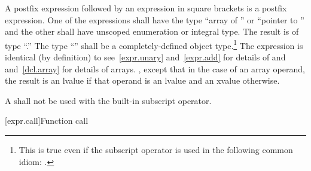 \pnum
{}%
%
A postfix expression followed by an expression in square brackets is a
postfix expression. One of the expressions shall have the type ``array of
'' or ``pointer
to '' and the other shall have unscoped enumeration or integral type.
The result is of type ``.''
%
The type ``'' shall be a completely-defined object type.\footnote{This
is true even if the subscript operator is used in the following common idiom:
.}
The expression  is identical (by definition) to
\enternote 
see~\ref{expr.unary} and~\ref{expr.add} for details of \tcode{*} and
\tcode{+} and~\ref{dcl.array} for details of arrays.
\exitnote, except that in the case of an array operand, the result is an lvalue
if that operand is an lvalue and an xvalue otherwise.

\pnum
A  shall not be used with the built-in subscript operator.

[expr.call]{Function call}

